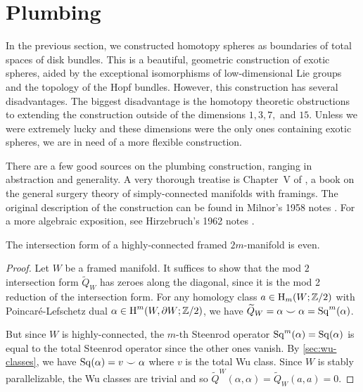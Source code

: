 \pagebreak
\section{Plumbing}\label{sec:plumbing}

In the previous section, we constructed homotopy spheres as boundaries of total spaces of disk bundles. This is a beautiful, geometric construction of exotic spheres, aided by the exceptional isomorphisms of low-dimensional Lie groups and the topology of the Hopf bundles.
However, this construction has several disadvantages.
The biggest disadvantage is the homotopy theoretic obstructions to extending the construction outside of the dimensions $1,3,7,$ and $15$. Unless we were extremely lucky and these dimensions were the only ones containing exotic spheres, we are in need of a more flexible construction.


There are a few good sources on the plumbing construction, ranging in abstraction and generality. A very thorough treatise is Chapter~V of \cite{browder1972surgery}, a book on the general surgery theory of simply-connected manifolds with framings. The original description of the construction can be found in Milnor's 1958 notes \cite{milnor1958manifolds}. For a more algebraic exposition, see Hirzebruch's 1962 notes \cite{hirzebruch1971quadratic}.

\begin{proposition}\label{prop:intersection-form-even}
	The intersection form of a highly-connected framed $2m$-manifold is even.
\end{proposition}
\begin{proof}
	Let $W$ be a framed manifold. It suffices to show that the mod $2$ intersection form $\widetilde{Q}_W$ has zeroes along the diagonal, since it is the mod 2 reduction of the intersection form. For any homology class $a\in \operatorname{H}_{m}(W;\mathbb{Z}/2)$ with Poincar\'e-Lefschetz dual $\alpha\in \operatorname{H}^{m}(W,\partial W;\mathbb{Z}/2)$, we have $\widetilde{Q}_W = \alpha\smile \alpha = \operatorname{Sq}^m(\alpha)$.

	But since $W$ is highly-connected, the $m$-th Steenrod operator $\operatorname{Sq}^m(\alpha)=\operatorname{Sq}(\alpha)$ is equal to the total Steenrod operator since the other ones vanish. By \cref{sec:wu-classes}, we have $\operatorname{Sq}(\alpha)=v\smile \alpha$ where $v$ is the total Wu class. Since $W$ is stably parallelizable, the Wu classes are trivial and so $\widetilde{Q}^W(\alpha,\alpha)=\widetilde{Q}_W(a,a)=0$.
\end{proof}

